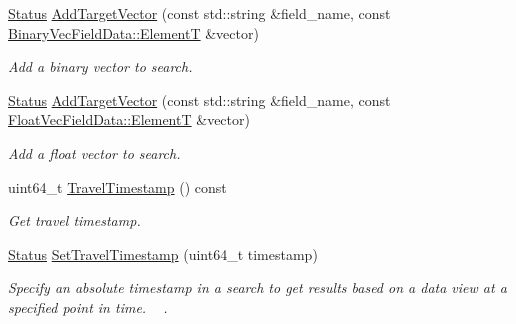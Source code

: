 \begin{DoxyCompactItemize}
\mbox{\label{classmilvus_1_1_search_arguments_a3c5f3050bbc9ef11d582156eda8de17b}} 
\hyperlink{classmilvus_1_1_status}{Status} \hyperlink{classmilvus_1_1_search_arguments_a3c5f3050bbc9ef11d582156eda8de17b}{Add\+Target\+Vector} (const std\+::string \&field\+\_\+name, const \hyperlink{classmilvus_1_1_field_data_a921c839e5d8df646cb7a20029ddb17f6}{Binary\+Vec\+Field\+Data\+::\+ElementT} \&vector)
\begin{DoxyCompactList}\small\item\em Add a binary vector to search. \end{DoxyCompactList}\item 
\mbox{\label{classmilvus_1_1_search_arguments_a8c1f949d3056d21a92c84331399e79ef}} 
\hyperlink{classmilvus_1_1_status}{Status} \hyperlink{classmilvus_1_1_search_arguments_a8c1f949d3056d21a92c84331399e79ef}{Add\+Target\+Vector} (const std\+::string \&field\+\_\+name, const \hyperlink{classmilvus_1_1_field_data_a921c839e5d8df646cb7a20029ddb17f6}{Float\+Vec\+Field\+Data\+::\+ElementT} \&vector)
\begin{DoxyCompactList}\small\item\em Add a float vector to search. \end{DoxyCompactList}\item 
\mbox{\label{classmilvus_1_1_search_arguments_a7266302c96fa8219a67e28d08fd4742c}} 
uint64\+\_\+t \hyperlink{classmilvus_1_1_search_arguments_a7266302c96fa8219a67e28d08fd4742c}{Travel\+Timestamp} () const
\begin{DoxyCompactList}\small\item\em Get travel timestamp. \end{DoxyCompactList}\item 
\hyperlink{classmilvus_1_1_status}{Status} \hyperlink{classmilvus_1_1_search_arguments_a4fae6c38804ea381a7c5c9ec21313c2a}{Set\+Travel\+Timestamp} (uint64\+\_\+t timestamp)
\begin{DoxyCompactList}\small\item\em Specify an absolute timestamp in a search to get results based on a data view at a specified point in time. ~\newline
. \end{DoxyCompactList}\item 
\mbox{\label{classmilvus_1_1_search_arguments_ab07eb3b4968436f36f0b3ec620dcdc11}} 

\end{DoxyCompactItemize}
